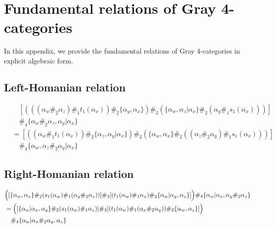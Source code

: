 \documentclass[11pt, reqno]{amsart} %
\theoremstyle{definition}
\theoremstyle{remark}
\numberwithin{equation}{section}
\begin{document}
\section{Fundamental relations of Gray 4-categories}
In this appendix, we provide the fundamental relations of Gray 4-categories in explicit algebraic form.

\subsection{Left-Homanian relation}
\begin{align}
  \nonumber
  &\quad 
  [
    (((\alpha_w\#_2\alpha_z)\#_1t_1(\alpha_x))\#_2\{\alpha_y,\alpha_x\})
    \#_3
    (\{\alpha_w,\alpha_z|\alpha_x\}\#_2(\alpha_y\#_1s_1(\alpha_x)))
  ] \\
  \nonumber
  &\quad \#_4
  \{\alpha_w\#_2\alpha_z,\alpha_y|\alpha_x\} \\
  \nonumber
  &= 
  [
    ((\alpha_w\#_1t_1(\alpha_x))\#_2\{\alpha_z,\alpha_y|\alpha_x\})
    \#_3
    (\{\alpha_w,\alpha_x\}\#_2((\alpha_z\#_2\alpha_y)\#_1s_1(\alpha_x)))
  ] \\
  \label{eq:left-Hom}
  &\quad \#_4
  \{\alpha_w,\alpha_z\#_2\alpha_y|\alpha_x\}
\end{align}

\subsection{Right-Homanian relation}
\begin{align}
  \nonumber
  &\Bigl(
    [\{\alpha_w,\alpha_x\}\#_2(s_1(\alpha_w)\#_1(\alpha_y\#_2\alpha_z))]
    \#_3
    [(t_1(\alpha_w)\#_1\alpha_x)\#_2\{\alpha_w|\alpha_y,\alpha_z\}]
  \Bigr) 
  \#_4
  \{\alpha_w|\alpha_x,\alpha_y\#_2\alpha_z\} \\
  \nonumber
  &= 
  \Bigl(
    [\{\alpha_w|\alpha_x,\alpha_y\}\#_2(s_1(\alpha_w)\#_1\alpha_z)]
    \#_3
    [(t_1(\alpha_w)\#_1(\alpha_x\#_2\alpha_y))\#_2\{\alpha_w,\alpha_z\}]
  \Bigr) 
  \\
  \label{eq:right-Hom}
  &\quad 
  \#_4
  \{\alpha_w|\alpha_x\#_2\alpha_y,\alpha_z\}
\end{align}
\end{document}
